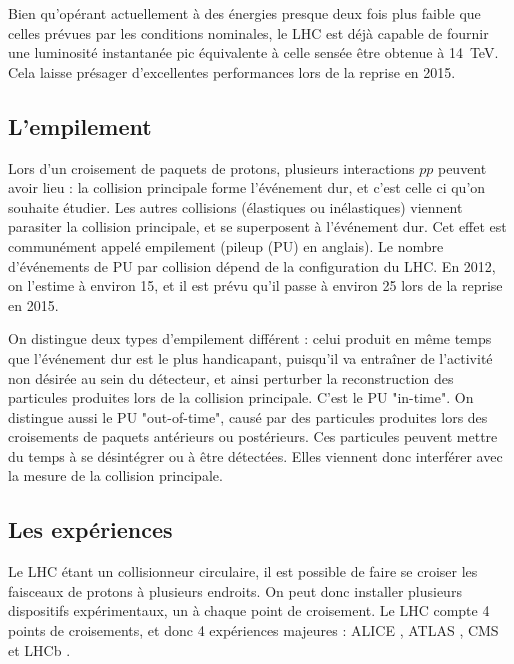 \bigskip

Bien qu'opérant actuellement à des énergies presque deux fois plus faible que celles prévues par les conditions nominales, le LHC est déjà capable de fournir une luminosité instantanée pic équivalente à celle sensée être obtenue à \SI{14}{\TeV}. Cela laisse présager d'excellentes performances lors de la reprise en 2015.

\subsection{L'empilement}

Lors d'un croisement de paquets de protons, plusieurs interactions $pp$ peuvent avoir lieu : la collision principale forme l'événement dur, et c'est celle ci qu'on souhaite étudier. Les autres collisions (élastiques ou inélastiques) viennent parasiter la collision principale, et se superposent à l'événement dur. Cet effet est communément appelé empilement (pileup (PU) en anglais). Le nombre d'événements de PU par collision dépend de la configuration du LHC. En 2012, on l'estime à environ 15, et il est prévu qu'il passe à environ 25 lors de la reprise en 2015.

\medskip

On distingue deux types d'empilement différent : celui produit en même temps que l'événement dur est le plus handicapant, puisqu'il va entraîner de l'activité non désirée au sein du détecteur, et ainsi perturber la reconstruction des particules produites lors de la collision principale. C'est le PU "in-time". On distingue aussi le PU "out-of-time", causé par des particules produites lors des croisements de paquets antérieurs ou postérieurs. Ces particules peuvent mettre du temps à se désintégrer ou à être détectées. Elles viennent donc interférer avec la mesure de la collision principale.

\subsection{Les expériences}

Le LHC étant un collisionneur circulaire, il est possible de faire se croiser les faisceaux de protons à plusieurs endroits. On peut donc installer plusieurs dispositifs expérimentaux, un à chaque point de croisement. Le LHC compte 4 points de croisements, et donc 4 expériences majeures : ALICE \citep{alice}, ATLAS \citep{atlas}, CMS \citep{cms} et LHCb \citep{lhcb}.

